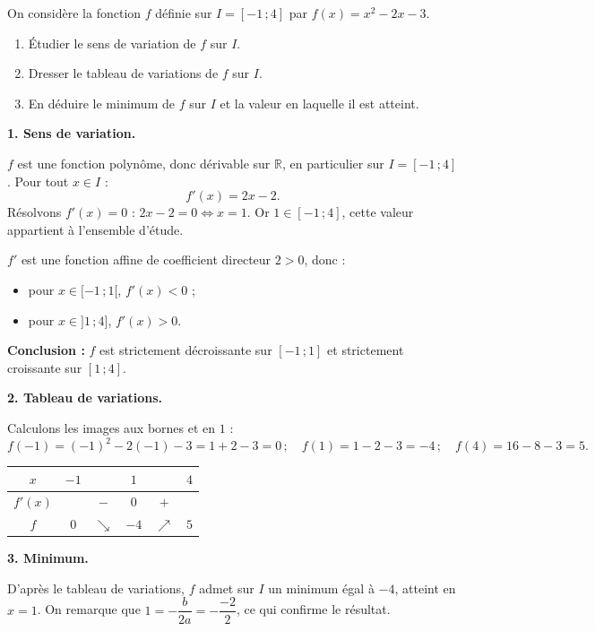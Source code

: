 \documentclass[11pt]{article}
\newcommand{\cle}[1]{{\popxbold\color{popdark}#1}}
\begin{document}
\begin{exoresolu}
On considère la fonction $f$ définie sur $I=[-1\,;4]$ par $f(x)=x^2-2x-3$.
\begin{enumerate}
\item Étudier le sens de variation de $f$ sur $I$.
\item Dresser le tableau de variations de $f$ sur $I$.
\item En déduire le minimum de $f$ sur $I$ et la valeur en laquelle il est atteint.
\end{enumerate}
\tcblower
\textbf{1. Sens de variation.}

$f$ est une fonction polynôme, donc dérivable sur $\mathbb{R}$, en particulier sur $I=[-1\,;4]$. Pour tout $x\in I$ :
\[f'(x)=2x-2.\]
Résolvons $f'(x)=0$ : $2x-2=0 \iff x=1$. Or $1\in[-1\,;4]$, cette valeur appartient à l'ensemble d'étude.

$f'$ est une fonction affine de coefficient directeur $2>0$, donc :
\begin{itemize}
\item pour $x\in[-1\,;1[$, $f'(x)<0$ ;
\item pour $x\in]1\,;4]$, $f'(x)>0$.
\end{itemize}
\textbf{Conclusion :} $f$ est strictement décroissante sur $[-1\,;1]$ et strictement croissante sur $[1\,;4]$.

\textbf{2. Tableau de variations.}

Calculons les images aux bornes et en $1$ :
\[f(-1)=(-1)^2-2(-1)-3=1+2-3=0\,;\quad f(1)=1-2-3=-4\,;\quad f(4)=16-8-3=5.\]
\begin{center}
\begin{tabular}{|c|ccccc|}\hline
$x$ & $-1$ & & $1$ & & $4$ \\ \hline
$f'(x)$ & & $-$ & $0$ & $+$ & \\ \hline
$f$ & $0$ & $\searrow$ & $-4$ & $\nearrow$ & $5$ \\ \hline
\end{tabular}
\end{center}

\textbf{3. Minimum.}

D'après le tableau de variations, $f$ admet sur $I$ un \cle{minimum} égal à $-4$, atteint en $x=1$. On remarque que $1=-\dfrac{b}{2a}=-\dfrac{-2}{2}$, ce qui confirme le résultat.
\end{exoresolu}
\end{document}
